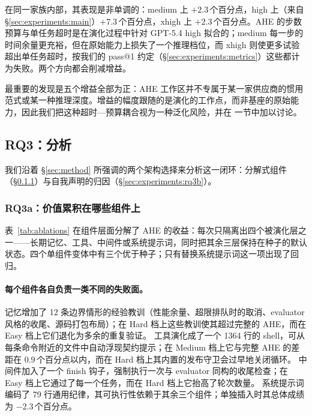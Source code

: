 在同一家族内部，其表现是非单调的：medium 上 $+2.3$\,个百分点，high 上（来自 \S\ref{sec:experiments:main}）$+7.3$\,个百分点，xhigh 上 $+2.3$\,个百分点。AHE 的步数预算与单任务超时是在演化过程中针对 GPT-5.4 high 拟合的；medium 每一步的时间余量更充裕，但在原始能力上损失了一个推理档位，而 xhigh 则使更多试验超出单任务超时，按我们的 pass@1 约定（\S\ref{sec:experiments:metrics}）这些都计为失败。两个方向都会削减增益。

最重要的发现是五个增益全部为正：AHE 工作区并不专属于某一家供应商的惯用范式或某一种推理深度。增益的幅度跟随的是演化的工作点，而非基座的原始能力，因此我们把这种超时—预算耦合视为一种泛化风险，并在  一节中加以讨论。

\subsection{RQ3：分析}
\label{sec:experiments:mechanism}

我们沿着 \S\ref{sec:method} 所强调的两个架构选择来分析这一闭环：分解式组件（\S\ref{sec:experiments:rq3a}）与自我声明的归因（\S\ref{sec:experiments:rq3b}）。


\subsubsection{RQ3a：价值累积在哪些组件上}
\label{sec:experiments:rq3a}


表~\ref{tab:ablations} 在组件层面分解了 AHE 的收益：每次只隔离出四个被演化层之一——长期记忆、工具、中间件或系统提示词，同时把其余三层保持在种子的默认状态。四个单组件变体中有三个优于种子；只有替换系统提示词这一项出现了回归。



\paragraph{每个组件各自负责一类不同的失败面。}
记忆增加了 12 条边界情形的经验教训（性能余量、超限排队时的取消、evaluator 风格的收尾、源码打包布局）；在 Hard 档上这些教训使其超过完整的 AHE，而在 Easy 档上它们退化为多余的重复验证。
工具演化成了一个 1364 行的 shell，可从每条命令附近的文件中自动浮现契约提示；在 Medium 档上它与完整 AHE 的差距在 $0.9$\,个百分点以内，而在 Hard 档上其内置的发布守卫会过早地关闭循环。
中间件加入了一个 finish 钩子，强制执行一次与 evaluator 同构的收尾检查；在 Easy 档上它通过了每一个任务，而在 Hard 档上它抬高了轮次数量。
系统提示词编码了 79 行通用纪律，其可执行性依赖于其余三个组件；单独插入时其总体成绩为 $-2.3$\,个百分点。

